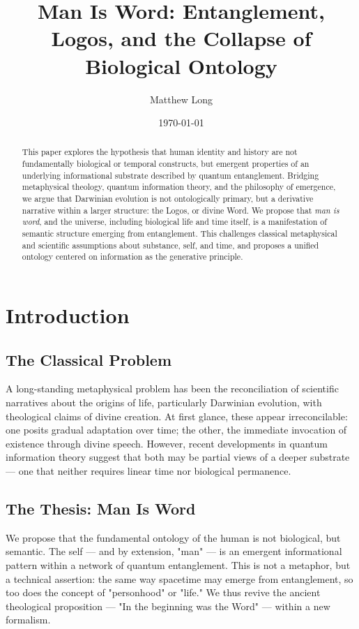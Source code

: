 \documentclass[12pt]{article}
\title{Man Is Word: Entanglement, Logos, and the Collapse of Biological Ontology}
\author{Matthew Long}
\affil{Yoneda AI}
\date{\today}
\begin{document}
\maketitle

\begin{abstract}
This paper explores the hypothesis that human identity and history are not fundamentally biological or temporal constructs, but emergent properties of an underlying informational substrate described by quantum entanglement. Bridging metaphysical theology, quantum information theory, and the philosophy of emergence, we argue that Darwinian evolution is not ontologically primary, but a derivative narrative within a larger structure: the Logos, or divine Word. We propose that \emph{man is word}, and the universe, including biological life and time itself, is a manifestation of semantic structure emerging from entanglement. This challenges classical metaphysical and scientific assumptions about substance, self, and time, and proposes a unified ontology centered on information as the generative principle.
\end{abstract}

\onehalfspacing

\tableofcontents

\newpage

\section{Introduction}
\subsection{The Classical Problem}
A long-standing metaphysical problem has been the reconciliation of scientific narratives about the origins of life, particularly Darwinian evolution, with theological claims of divine creation. At first glance, these appear irreconcilable: one posits gradual adaptation over time; the other, the immediate invocation of existence through divine speech. However, recent developments in quantum information theory suggest that both may be partial views of a deeper substrate — one that neither requires linear time nor biological permanence.

\subsection{The Thesis: Man Is Word}
We propose that the fundamental ontology of the human is not biological, but semantic. The self — and by extension, "man" — is an emergent informational pattern within a network of quantum entanglement. This is not a metaphor, but a technical assertion: the same way spacetime may emerge from entanglement, so too does the concept of "personhood" or "life." We thus revive the ancient theological proposition — "In the beginning was the Word" — within a new formalism.
\end{document}
